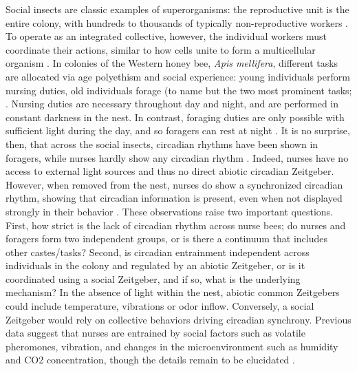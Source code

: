 \documentclass{article}
\begin{document}
Social insects are classic examples of superorganisms: the reproductive unit is the entire colony, with hundreds to thousands of typically non-reproductive workers \cite{holldobler_superorganism_2009}. To operate as an integrated collective, however, the individual workers must coordinate their actions, similar to how cells unite to form a multicellular organism \cite{smith_major_1997}. In colonies of the Western honey bee, \textit{Apis mellifera}, different tasks are allocated via age polyethism and social experience: young individuals perform nursing duties, old individuals forage (to name but the two most prominent tasks; \cite{seeley_adaptive_1982, wild_social_2021}. Nursing duties are necessary throughout day and night, and are performed in constant darkness in the nest. In contrast, foraging duties are only possible with sufficient light during the day, and so foragers can rest at night \cite{klein_caste-dependent_2008, klein_sleep_2010}. It is no surprise, then, that across the social insects, circadian rhythms have been shown in foragers, while nurses hardly show any circadian rhythm \cite{crailsheim_diurnal_1996, moore_timekeeping_1998, toma_changes_2000, shemesh_natural_2007, shemesh_molecular_2010, bloch_reversal_2001, fujioka2017ant, mildner2017plasticity, eban2011maternity}.
Indeed, nurses have no access to external light sources and thus no direct abiotic circadian Zeitgeber. However, when removed from the nest, nurses do show a synchronized circadian rhythm, showing that circadian information is present, even when not displayed strongly in their behavior \cite{fuchikawa_potent_2016, shemesh_natural_2007, shemesh_molecular_2010, siehler_remarkable_2021}. These observations raise two important questions. First, how strict is the lack of circadian rhythm across nurse bees; do nurses and foragers form two independent groups, or is there a continuum that includes other castes/tasks? Second, is circadian entrainment independent across individuals in the colony and regulated by an abiotic Zeitgeber, or is it coordinated using a social Zeitgeber, and if so, what is the underlying mechanism? In the absence of light within the nest, abiotic common Zeitgebers could include temperature, vibrations or odor inflow. Conversely, a social Zeitgeber would rely on collective behaviors driving circadian synchrony. Previous data suggest that nurses are entrained by social factors such as volatile pheromones, vibration, and changes in the microenvironment such as humidity and CO2 concentration, though the details remain to be elucidated \cite{fuchikawa_potent_2016}.
\end{document}

